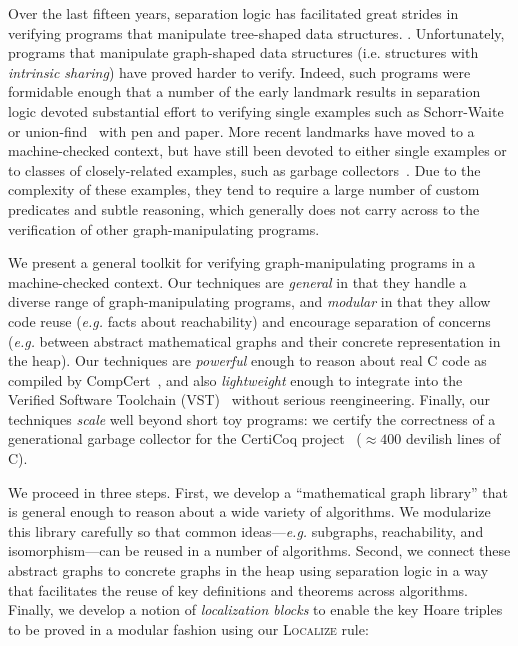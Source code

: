 Over the last fifteen years, separation logic has facilitated great strides 
in verifying programs that manipulate tree-shaped data structures. 
\citep{berdine:smallfoot,chin:hipsleek,jacobs:verifast,
chlipala:bedrock,bengtson:charge,appel:programlogics}. 
Unfortunately, programs that manipulate graph-shaped data structures 
(i.e. structures with \emph{intrinsic sharing}) have proved harder to verify.  
Indeed, such programs were formidable enough that a number of the early 
landmark results in separation logic devoted substantial effort to verifying 
single examples such as Schorr-Waite~\cite{hongseok:phd} or 
union-find~\cite{neelthesis} with pen and paper.  
More recent landmarks have moved to a machine-checked context, but have still
been devoted to either single examples or to classes of closely-related examples, 
such as garbage collectors~\cite{blah,cakemlgc}.
Due to the complexity of these examples, they tend to require a large number 
of custom predicates and subtle reasoning, which generally does not carry across 
to the verification of other graph-manipulating programs.

We present a general toolkit for verifying graph-manipulating programs in a 
machine-checked context. Our techniques are \emph{general} in that they handle a diverse 
range of graph-manipulating programs, and \emph{modular} in that they allow code
reuse (\emph{e.g.} facts about reachability) and encourage separation of concerns 
(\emph{e.g.} between abstract mathematical graphs and their concrete representation 
in the heap).
Our techniques are \emph{powerful} enough to reason about real C code as compiled by 
CompCert~\cite{leroy:compcert}, and also 
\emph{lightweight} enough to integrate into the Verified 
Software Toolchain (VST)~\cite{appel:programlogics} without serious reengineering.
{\color{magenta}Finally, our techniques \emph{scale} well beyond short toy programs: we certify the 
correctness of a generational garbage collector for the CertiCoq 
project~\cite{certicoqwebsite} ($\approx400$ devilish lines of C).}

We proceed in three steps. First, we develop a ``mathematical graph library'' that is general enough to reason about a wide variety of algorithms.  We modularize this library carefully so that common ideas---\emph{e.g.} subgraphs, reachability, and isomorphism---can be reused in a number of algorithms.  
Second, we connect these abstract graphs to
concrete graphs in the heap using separation logic in a way that facilitates the reuse of key definitions and theorems across algorithms.  Finally, we develop a notion of \emph{localization blocks} to
enable the key Hoare triples to be proved in a modular fashion using our \textsc{Localize}
rule:

